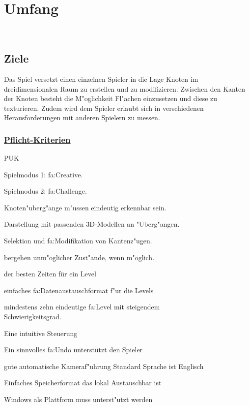 %
%


\chapter{Umfang}
\label{UF}~\\


%
%
\section{Ziele}
\label{UF:Ziele}

Das Spiel versetzt einen einzelnen Spieler in die Lage Knoten im dreidimensionalen Raum zu erstellen und zu modifizieren. Zwischen den Kanten der Knoten besteht die M{"o}glichkeit Fl{"a}chen einzusetzen und diese zu texturieren. Zudem wird dem Spieler erlaubt sich in verschiedenen Herausforderungen mit anderen Spielern zu messen.\\

% 
%
\subsection*{\underline{Pflicht-Kriterien}}

\begin{ids}{\gls{PUK}}


		\id[10] Spielmodus 1: \gls{fa:Creative}.
		
		\id[20] Spielmodus 2: \gls{fa:Challenge}.
		
		\id[30] Knoten{"u}berg{"a}nge m{"u}ssen eindeutig erkennbar sein.
		
		\id[40] Darstellung mit passenden 3D-Modellen an {"U}berg{"a}ngen.
		
		\id[50] Selektion und \gls{fa:Modifikation} von Kantenz{"u}gen.
		
		bergehen unm{"o}glicher Zust{"a}nde, wenn m{"o}glich.
		
		 der besten Zeiten für ein Level
		
		\id[80] einfaches \gls{fa:Datenaustauschformat} f{"u}r die Levels
		
		\id[80] mindestens zehn eindeutige \gls{fa:Level} mit steigendem \\Schwierigkeitsgrad.
		
		\id[90] Eine intuitive Steuerung 
		
		\id[100] Ein sinnvolles \gls{fa:Undo} unterstützt den Spieler
		
		\id[110] gute automatische Kameraf{"u}hrung
		\id[120] Standard Sprache ist Englisch
		
	
		\id[130] Einfaches Speicherformat das lokal Austauschbar ist
		
		\id[140] Windows als Plattform muss unterst{"u}tzt werden

\end{ids}

